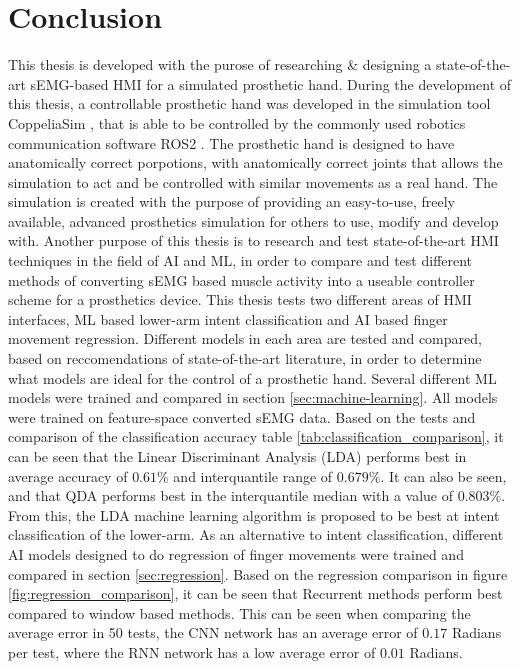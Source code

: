 \documentclass[../main.tex]{subfiles}
\begin{document}
\section{Conclusion}

This thesis is developed with the purose of researching \& designing a state-of-the-art sEMG-based HMI for a simulated prosthetic hand.
During the development of this thesis, a controllable prosthetic hand was developed in the simulation tool CoppeliaSim \cite{coppeliasim}, that is able to be controlled by the commonly used robotics communication software ROS2 \cite{ros2}.
The prosthetic hand is designed to have anatomically correct porpotions, with anatomically correct joints that allows the simulation to act and be controlled with similar movements as a real hand. 
The simulation is created with the purpose of providing an easy-to-use, freely available, advanced prosthetics simulation for others to use, modify and develop with. 
Another purpose of this thesis is to research and test state-of-the-art HMI techniques in the field of AI and ML, in order to compare and test different methods of converting sEMG based muscle activity into a useable controller scheme for a prosthetics device.
This thesis tests two different areas of HMI interfaces, ML based lower-arm intent classification and AI based finger movement regression.
Different models in each area are tested and compared, based on reccomendations of state-of-the-art
literature, in order to determine what models are ideal for the control of a prosthetic hand.
Several different ML models were trained and compared in section \ref{sec:machine-learning}.
All models were trained on feature-space converted sEMG data.
Based on the tests and comparison of the classification accuracy table \ref{tab:classification_comparison}, it can be seen that the Linear Discriminant Analysis (LDA) performs best in average accuracy of $0.61\%$ and interquantile range of $0.679\%$.
It can also be seen, and that QDA performs best in the interquantile median with a value of $0.803\%$.
From this, the LDA machine learning algorithm is proposed to be best at intent classification of the lower-arm.
As an alternative to intent classification, different AI models designed to do regression of finger movements were trained and compared in section \ref{sec:regression}.
Based on the regression comparison in figure \ref{fig:regression_comparison}, it can be seen that Recurrent methods perform best compared to window based methods.
This can be seen when comparing the average error in 50 tests, the CNN network has an average error of $0.17$ Radians per test, where the RNN network has a low average error of $0.01$ Radians.
\end{document}
